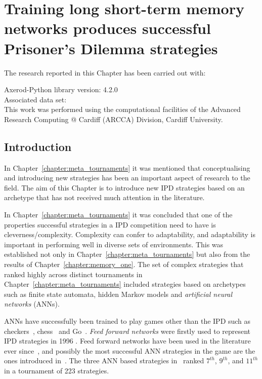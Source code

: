 \chapter{Training long short-term memory networks produces successful Prisoner's Dilemma strategies}\label{chapter:lstm}

\begin{center}
    The research reported in this Chapter has been carried out with:

    Axerod-Python library version: 4.2.0 \\
    Associated data set: \\ %
    This work was performed using the computational facilities of the Advanced Research
    Computing @ Cardiff (ARCCA) Division, Cardiff University.\\ \vspace{.5cm} 
\end{center}

\hrulefill

\section{Introduction}

In Chapter~\ref{chapter:meta_tournaments} it was mentioned that conceptualising
and introducing new strategies has been an important aspect of research to the
field. The aim of this Chapter is to introduce new IPD strategies based on an
archetype that has not received much attention in the literature.

In Chapter~\ref{chapter:meta_tournaments} it was concluded that one of the
properties successful strategies in a IPD competition need to have is
cleverness/complexity. Complexity can confer to adaptability, and adaptability
is important in performing well in diverse sets of environments. This was
established not only in Chapter~\ref{chapter:meta_tournaments} but also from the
results of Chapter~\ref{chapter:memory_one}. The set of complex strategies that
ranked highly across distinct tournaments in
Chapter~\ref{chapter:meta_tournaments} included strategies based on archetypes
such as finite state automata, hidden Markov models and \textit{artificial
neural networks} (ANNs).

ANNs have successfully been trained to play games other than the IPD such as
checkers~\cite{Chellapilla1999}, chess~\cite{Fogel2004} and
Go~\cite{Silver2016}. \textit{Feed forward networks} were firstly used to represent IPD
strategies in 1996 \cite{Harrald1996}. Feed forward networks have been used in
the literature ever since~\cite{Ashlock2008, Ashlock2006a, Darwen2001,
Franken2005}, and possibly the most successful ANN strategies in the game are
the ones introduced in~\cite{Harper2017}. The three ANN based strategies
in~\cite{Harper2017} ranked \(7^{th}\), \(9^{th}\), and \(11^{th}\) in a
tournament of 223 strategies.

